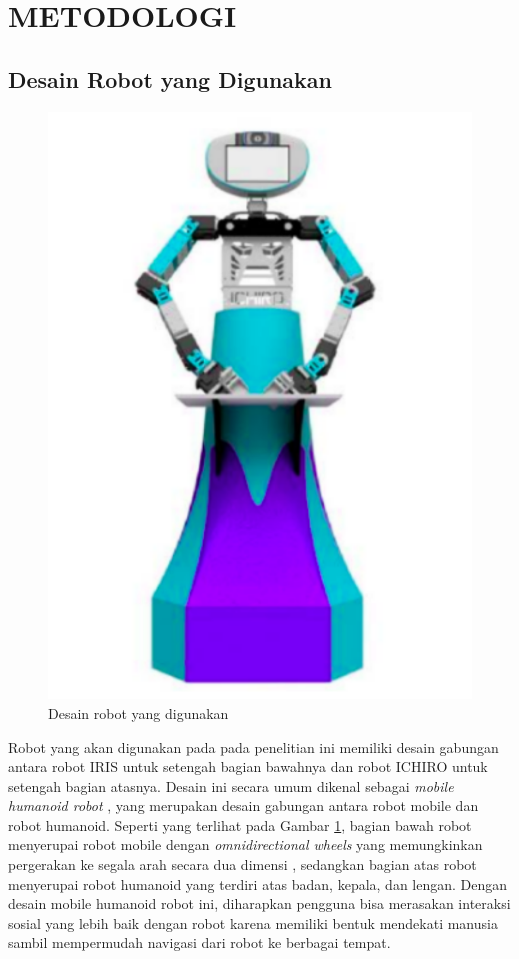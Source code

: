 \section{METODOLOGI}

\subsection{Desain Robot yang Digunakan}

\begin{figure} [ht] \centering
  \includegraphics[scale=0.50]{gambar/robot-design.png}
  \caption{Desain robot yang digunakan}
  \label{fig:RobotDesign}
\end{figure}

Robot yang akan digunakan pada pada penelitian ini memiliki desain gabungan antara robot IRIS \citep{Dikairono2020} untuk setengah bagian bawahnya dan robot ICHIRO \citep{Muhtadin2019} untuk setengah bagian atasnya.
Desain ini secara umum dikenal sebagai \emph{mobile humanoid robot} \citep{Mohamed2012}, yang merupakan desain gabungan antara robot mobile dan robot humanoid.
Seperti yang terlihat pada Gambar \ref{fig:RobotDesign}, bagian bawah robot menyerupai robot mobile dengan \emph{omnidirectional wheels} yang memungkinkan pergerakan ke segala arah secara dua dimensi \citep{Oliveira2008}, sedangkan bagian atas robot menyerupai robot humanoid yang terdiri atas badan, kepala, dan lengan.
Dengan desain mobile humanoid robot ini, diharapkan pengguna bisa merasakan interaksi sosial yang lebih baik dengan robot karena memiliki bentuk mendekati manusia \citep{Rossi2018} sambil mempermudah navigasi dari robot ke berbagai tempat.

